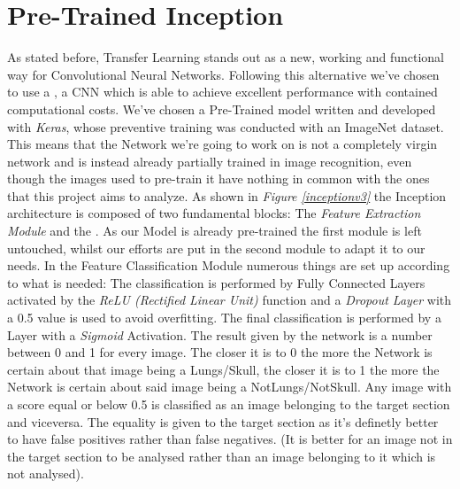 \documentclass[../main.tex]{subfiles}
\begin{document}
\section{Pre-Trained Inception}
As stated before, Transfer Learning stands out as a new, working and functional way for Convolutional Neural Networks. Following this alternative we've chosen to use a , a CNN which is able to achieve excellent performance with contained computational costs.\cite{Szegedy2015a} We've chosen a Pre-Trained model written and developed with \textit{Keras}, whose preventive training was conducted with an ImageNet dataset.\cite{kerasinception} This means that the Network we're going to work on is not a completely virgin network and is instead already partially trained in image recognition, even though the images used to pre-train it have nothing in common with the ones that this project aims to analyze.
As shown in \textit{Figure \ref{inceptionv3}} the Inception architecture is composed of two fundamental blocks: The \textit{Feature Extraction Module} and the . As our Model is already pre-trained the first module is left untouched, whilst our efforts are put in the second module to adapt it to our needs.
In the Feature Classification Module numerous things are set up according to what is needed: The classification is performed by Fully Connected Layers activated by the \textit{ReLU (Rectified Linear Unit)} function and a \textit{Dropout Layer} with a 0.5 value is used to avoid overfitting. The final classification is performed by a Layer with a \textit{Sigmoid} Activation. The result given by the network is a number between 0 and 1 for every image. The closer it is to 0 the more the Network is certain about that image being a Lungs/Skull, the closer it is to 1 the more the Network is certain about said image being a NotLungs/NotSkull. Any image with a score equal or below 0.5 is classified as an image belonging to the target section and viceversa. The equality is given to the target section as it's definetly better to have false positives rather than false negatives. (It is better for an image not in the target section to be analysed rather than an image belonging to it which is not analysed). 
\end{document}

